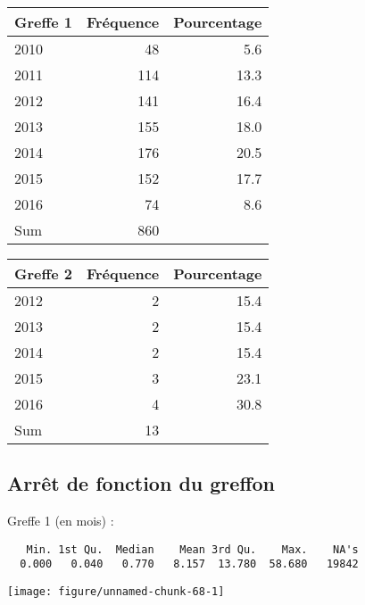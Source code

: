 \documentclass[11pt,a4paper]{article}\usepackage[]{graphicx}\usepackage[]{color}
\makeatletter
\def\maxwidth{ %
  \ifdim\Gin@nat@width>\linewidth
    \linewidth
  \else
    \Gin@nat@width
  \fi
}
\newenvironment{kframe}{%
 \def\at@end@of@kframe{}%
 \ifinner\ifhmode%
  \def\at@end@of@kframe{\end{minipage}}%
  \begin{minipage}{\columnwidth}%
 \fi\fi%
 \def\FrameCommand##1{\hskip\@totalleftmargin \hskip-\fboxsep
 \colorbox{shadecolor}{##1}\hskip-\fboxsep
     \hskip-\linewidth \hskip-\@totalleftmargin \hskip\columnwidth}%
 \MakeFramed {\advance\hsize-\width
   \@totalleftmargin\z@ \linewidth\hsize
   \@setminipage}}%
 {\par\unskip\endMakeFramed%
 \at@end@of@kframe}
\newenvironment{knitrout}{}{} %
\makeatother
\begin{document}
\begin{table}[H]
\centering
\begin{tabular}{lrr}
  \hline
Greffe 1 & Fréquence & Pourcentage \\ 
  \hline
2010 & 48 & 5.6 \\ 
  2011 & 114 & 13.3 \\ 
  2012 & 141 & 16.4 \\ 
  2013 & 155 & 18.0 \\ 
  2014 & 176 & 20.5 \\ 
  2015 & 152 & 17.7 \\ 
  2016 & 74 & 8.6 \\ 
  Sum & 860 &  \\ 
   \hline
\end{tabular}
\end{table}
\begin{table}[H]
\centering
\begin{tabular}{lrr}
  \hline
Greffe 2 & Fréquence & Pourcentage \\ 
  \hline
2012 &  2 & 15.4 \\ 
  2013 &  2 & 15.4 \\ 
  2014 &  2 & 15.4 \\ 
  2015 &  3 & 23.1 \\ 
  2016 &  4 & 30.8 \\ 
  Sum & 13 &  \\ 
   \hline
\end{tabular}
\end{table}



  \subsection{Arrêt de fonction du greffon}

Greffe 1 (en mois) :
  
\begin{knitrout}
\color{fgcolor}\begin{kframe}
\begin{verbatim}
   Min. 1st Qu.  Median    Mean 3rd Qu.    Max.    NA's 
  0.000   0.040   0.770   8.157  13.780  58.680   19842 
\end{verbatim}
\end{kframe}
\texttt{[image: figure/unnamed-chunk-68-1]} 

\end{knitrout}
\end{document}
